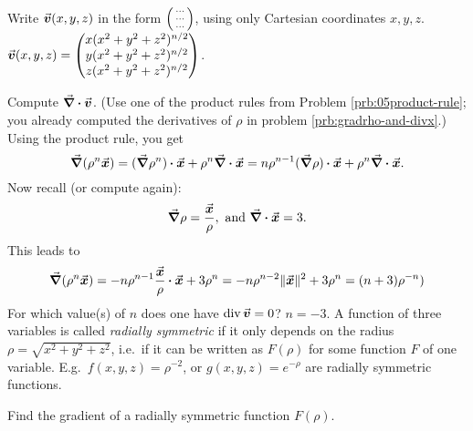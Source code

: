 \documentclass{amsart}
\begin{document}
\subprob Write ${{\vec{\boldsymbol v}}}(x, y, z)$ in the form $\left(\begin{smallmatrix} \cdots\\\cdots\\\cdots\end{smallmatrix}\right)$, %
using only Cartesian coordinates $x, y, z$.
\answer
${{\vec{\boldsymbol v}}}(x, y, z) =
\begin{pmatrix}
   x(x^2+y^2+z^2)^{n/2} \\ y(x^2+y^2+z^2)^{n/2} \\ z(x^2+y^2+z^2)^{n/2}
\end{pmatrix}$.
\endanswer


\subprob Compute ${\vec{\boldsymbol \nabla}}\pmb{\cdot}{{\vec{\boldsymbol v}}}$.  (Use one of the product %
rules from Problem \ref{prb:05product-rule}; you already
computed the derivatives of $\rho$ in problem \ref{prb:gradrho-and-divx}.)
\answer
Using the product rule, you get
\[
{\vec{\boldsymbol \nabla}}(\rho^{n}{{\vec{\boldsymbol x}}})
= ({\vec{\boldsymbol \nabla}} \rho^{n})\pmb{\cdot}{{\vec{\boldsymbol x}}} + \rho^{n}{\vec{\boldsymbol \nabla}}\pmb{\cdot}{{\vec{\boldsymbol x}}}
= n\rho^{n-1}({\vec{\boldsymbol \nabla}}\rho)\pmb{\cdot}{{\vec{\boldsymbol x}}} + \rho^{n}{\vec{\boldsymbol \nabla}}\pmb{\cdot}{{\vec{\boldsymbol x}}}.
\]
Now recall (or compute again):
\[
{\vec{\boldsymbol \nabla}} \rho = \frac{{{\vec{\boldsymbol x}}}} {\rho}, \text{ and }
{\vec{\boldsymbol \nabla}}\pmb{\cdot}{{\vec{\boldsymbol x}}} = 3.
\]
This leads to
\[
{\vec{\boldsymbol \nabla}}(\rho^{n}{{\vec{\boldsymbol x}}})
= - n \rho^{n-1}\frac{{{\vec{\boldsymbol x}}}} {\rho}\pmb{\cdot}{{\vec{\boldsymbol x}}} + 3 \rho^{n}
= - n \rho^{n-2}\|{{\vec{\boldsymbol x}}}\|^2 + 3 \rho^{n}
= (n+3) \rho^{-n})
\]
\endanswer
\subprob For which value(s) of $n$ does one have $\mathop{\rm div} {{\vec{\boldsymbol v}}} = 0$? %
\answer
$n=-3$.
\endanswer
\problem\label{prb:05grad-Frho} A function of three variables %
is called \emph{radially symmetric}
if it only depends on the radius $\rho = \sqrt{x^2+y^2+z^2}$, i.e.\
if it can be written as $F(\rho)$ for some function $F$ of one variable.
E.g.\ $f(x, y, z) = \rho^{-2}$, or $g(x, y, z) = e^{-\rho}$ are radially
symmetric functions. 


\subprob Find the gradient of a radially symmetric function $F(\rho)$. %
\end{document}
